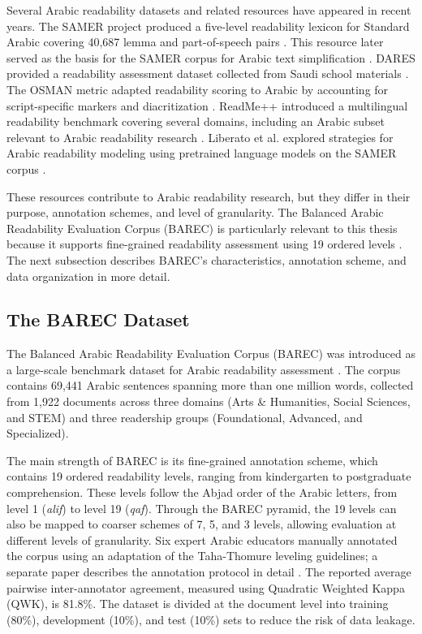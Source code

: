 \documentclass[12pt]{report}
\begin{document}
Several Arabic readability datasets and related resources have appeared in recent years. The SAMER project produced a five-level readability lexicon for Standard Arabic covering 40,687 lemma and part-of-speech pairs \cite{alkhalil2020samer}. This resource later served as the basis for the SAMER corpus for Arabic text simplification \cite{alhafni2024samer}. DARES provided a readability assessment dataset collected from Saudi school materials \cite{elhaj2024dares}. The OSMAN metric adapted readability scoring to Arabic by accounting for script-specific markers and diacritization \cite{elhaj2016osman}. ReadMe++ introduced a multilingual readability benchmark covering several domains, including an Arabic subset relevant to Arabic readability research \cite{naous2024readme}. Liberato et al. explored strategies for Arabic readability modeling using pretrained language models on the SAMER corpus \cite{liberato2024strategies}.

These resources contribute to Arabic readability research, but they differ in their purpose, annotation schemes, and level of granularity. The Balanced Arabic Readability Evaluation Corpus (BAREC) is particularly relevant to this thesis because it supports fine-grained readability assessment using 19 ordered levels \cite{elmadani2025barec}. The next subsection describes BAREC's characteristics, annotation scheme, and data organization in more detail.


\subsection{The BAREC Dataset}

The Balanced Arabic Readability Evaluation Corpus (BAREC) was introduced as a large-scale benchmark dataset for Arabic readability assessment \cite{elmadani2025barec}. The corpus contains 69,441 Arabic sentences spanning more than one million words, collected from 1,922 documents across three domains (Arts \& Humanities, Social Sciences, and STEM) and three readership groups (Foundational, Advanced, and Specialized).

The main strength of BAREC is its fine-grained annotation scheme, which contains 19 ordered readability levels, ranging from kindergarten to postgraduate comprehension. These levels follow the Abjad order of the Arabic letters, from level 1 (\textit{alif}) to level 19 (\textit{qaf}). Through the BAREC pyramid, the 19 levels can also be mapped to coarser schemes of 7, 5, and 3 levels, allowing evaluation at different levels of granularity. Six expert Arabic educators manually annotated the corpus using an adaptation of the Taha-Thomure leveling guidelines; a separate paper describes the annotation protocol in detail \cite{habash2025guidelines}. The reported average pairwise inter-annotator agreement, measured using Quadratic Weighted Kappa (QWK), is 81.8\%. The dataset is divided at the document level into training (80\%), development (10\%), and test (10\%) sets to reduce the risk of data leakage.
\end{document}

